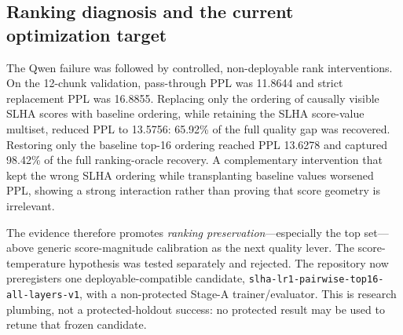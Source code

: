 \documentclass[11pt]{article}
\newenvironment{addedblock}{\begingroup\color{revisionblue}}{\endgroup}
\theoremstyle{plain}
\theoremstyle{definition}
\begin{document}
\subsection{Ranking diagnosis and the current optimization target}
\label{sec:rankdiag}
\begin{addedblock}
The Qwen failure was followed by controlled, non-deployable rank interventions.
On the 12-chunk validation, pass-through PPL was 11.8644 and strict replacement
PPL was 16.8855. Replacing only the ordering of causally visible SLHA scores
with baseline ordering, while retaining the SLHA score-value multiset, reduced
PPL to 13.5756: 65.92\% of the full quality gap was recovered. Restoring only
the baseline top-16 ordering reached PPL 13.6278 and captured 98.42\% of the
full ranking-oracle recovery. A complementary intervention that kept the wrong
SLHA ordering while transplanting baseline values worsened PPL, showing a strong
interaction rather than proving that score geometry is irrelevant.

The evidence therefore promotes \emph{ranking preservation}---especially the
top set---above generic score-magnitude calibration as the next quality lever.
The score-temperature hypothesis was tested separately and rejected. The
repository now preregisters one deployable-compatible candidate,
\texttt{slha-lr1-pairwise-top16-all-layers-v1}, with a non-protected Stage-A
trainer/evaluator. This is research plumbing, not a protected-holdout success:
no protected result may be used to retune that frozen candidate.
\end{addedblock}
\end{document}
